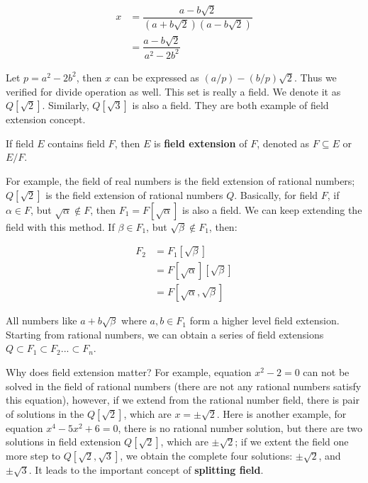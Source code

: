 \documentclass[b5paper]{article}
\begin{document}
\begin{align*}
x & = \dfrac{a - b \sqrt{2}}{(a + b \sqrt{2})(a - b \sqrt{2})} \\[3pt]
  & = \dfrac{a - b \sqrt{2}}{a^2 - 2b^2}
\end{align*}

Let $p = a^2 - 2b^2$, then $x$ can be expressed as $(a/p) -(b/p)\sqrt{2}$. Thus we verified for divide operation as well. This set is really a field. We denote it as $Q[\sqrt{2}]$. Similarly, $Q[\sqrt{3}]$ is also a field. They are both example of field extension concept.

\begin{definition}
If field $E$ contains field $F$, then $E$ is \textbf{field extension} of $F$, denoted as $F \subseteq E$ or $E/F$.
\end{definition}

For example, the field of real numbers is the field extension of rational numbers; $Q[\sqrt{2}]$ is the field extension of rational numbers $Q$. Basically, for field $F$, if $\alpha \in F$, but $\sqrt{\alpha} \not\in F$, then $F_1 = F[\sqrt{\alpha}]$ is also a field. We can keep extending the field with this method. If $\beta \in F_1$, but $\sqrt{\beta} \not\in F_1$, then:

\[
\begin{array}{rl}
F_2 & = F_1[\sqrt{\beta}] \\
    & = F[\sqrt{\alpha}][\sqrt{\beta}] \\
    & = F[\sqrt{\alpha}, \sqrt{\beta}]
\end{array}
\]

All numbers like $a + b \sqrt{\beta}$ where $a, b \in F_1$ form a higher level field extension. Starting from rational numbers, we can obtain a series of field extensions $Q \subset F_1 \subset F_2 ... \subset F_n$.

Why does field extension matter? For example, equation $x^2 - 2 = 0$ can not be solved in the field of rational numbers (there are not any rational numbers satisfy this equation), however, if we extend from the rational number field, there is pair of solutions in the $Q[\sqrt{2}]$, which are $x = \pm \sqrt{2}$. Here is another example, for equation $x^4 - 5x^2 + 6 = 0$, there is no rational number solution, but there are two solutions in field extension $Q[\sqrt{2}]$, which are $\pm \sqrt{2}$; if we extent the field one more step to $Q[\sqrt{2}, \sqrt{3}]$, we obtain the complete four solutions: $\pm \sqrt{2}$, and $\pm \sqrt{3}$. It leads to the important concept of \textbf{splitting field}.
\end{document}
